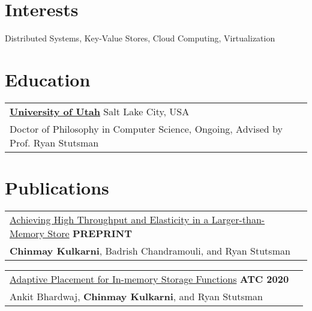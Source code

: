 \documentclass[margin,line]{res}
\begin{document}
\name{Chinmay Kulkarni (chinmayk@cs.utah.edu, www.chinmayk.net) %
}
\begin{resume}

\section{\sc Interests}
Distributed Systems, Key-Value Stores, Cloud Computing, Virtualization

\section{\sc Education}
 \begin{tabular}{@{}p{5.5in}p{4in}}
  {\bf \href{http://www.cs.utah.edu/}{University of Utah}} \dotfill Salt Lake City,
  USA \\
 {\small Doctor of Philosophy in Computer Science, Ongoing, Advised by Prof. Ryan Stutsman}
 \end{tabular}

\section{\sc Publications}
 \vspace{-2.5pt}
 \begin{tabular}{@{}p{5.5in}p{4in}}
 \href{https://arxiv.org/abs/2006.03206}{Achieving High Throughput and
 Elasticity in a Larger-than-Memory Store} \hfill
 {\small\bf PREPRINT}\\
 {\small {\bf Chinmay Kulkarni}, Badrish Chandramouli, and Ryan Stutsman}\\
 \end{tabular}

 \vspace{-2.5pt}
 \begin{tabular}{@{}p{5.5in}p{4in}}
 \href{http://utah.systems/projects/kulkarni\_splinter}{Adaptive
 Placement for In-memory Storage Functions} \hfill
 {\small\bf ATC 2020}\\
 {\small Ankit Bhardwaj, {\bf Chinmay Kulkarni}, and Ryan Stutsman}\\
 \end{tabular}


\end{resume}
\end{document}
